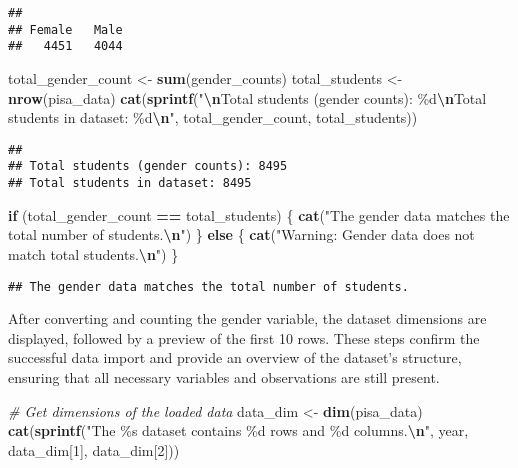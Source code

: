 \documentclass[
]{article}
\newenvironment{Shaded}{\begin{snugshade}}{\end{snugshade}}
\newcommand{\CommentTok}[1]{\textcolor[rgb]{0.56,0.35,0.01}{\textit{#1}}}
\newcommand{\ControlFlowTok}[1]{\textcolor[rgb]{0.13,0.29,0.53}{\textbf{#1}}}
\newcommand{\DecValTok}[1]{\textcolor[rgb]{0.00,0.00,0.81}{#1}}
\newcommand{\FunctionTok}[1]{\textcolor[rgb]{0.13,0.29,0.53}{\textbf{#1}}}
\newcommand{\NormalTok}[1]{#1}
\newcommand{\OtherTok}[1]{\textcolor[rgb]{0.56,0.35,0.01}{#1}}
\newcommand{\SpecialCharTok}[1]{\textcolor[rgb]{0.81,0.36,0.00}{\textbf{#1}}}
\newcommand{\StringTok}[1]{\textcolor[rgb]{0.31,0.60,0.02}{#1}}
\begin{document}
\begin{verbatim}
## 
## Female   Male 
##   4451   4044
\end{verbatim}

\begin{Shaded}
\begin{Highlighting}[]
\NormalTok{total\_gender\_count }\OtherTok{\textless{}{-}} \FunctionTok{sum}\NormalTok{(gender\_counts)}
\NormalTok{total\_students }\OtherTok{\textless{}{-}} \FunctionTok{nrow}\NormalTok{(pisa\_data)}
\FunctionTok{cat}\NormalTok{(}\FunctionTok{sprintf}\NormalTok{(}\StringTok{"}\SpecialCharTok{\textbackslash{}n}\StringTok{Total students (gender counts): \%d}\SpecialCharTok{\textbackslash{}n}\StringTok{Total students in dataset: \%d}\SpecialCharTok{\textbackslash{}n}\StringTok{"}\NormalTok{, total\_gender\_count, total\_students))}
\end{Highlighting}
\end{Shaded}

\begin{verbatim}
## 
## Total students (gender counts): 8495
## Total students in dataset: 8495
\end{verbatim}

\begin{Shaded}
\begin{Highlighting}[]
\ControlFlowTok{if}\NormalTok{ (total\_gender\_count }\SpecialCharTok{==}\NormalTok{ total\_students) \{}
    \FunctionTok{cat}\NormalTok{(}\StringTok{"The gender data matches the total number of students.}\SpecialCharTok{\textbackslash{}n}\StringTok{"}\NormalTok{)}
\NormalTok{\} }\ControlFlowTok{else}\NormalTok{ \{}
    \FunctionTok{cat}\NormalTok{(}\StringTok{"Warning: Gender data does not match total students.}\SpecialCharTok{\textbackslash{}n}\StringTok{"}\NormalTok{)}
\NormalTok{\}}
\end{Highlighting}
\end{Shaded}

\begin{verbatim}
## The gender data matches the total number of students.
\end{verbatim}

After converting and counting the gender variable, the dataset
dimensions are displayed, followed by a preview of the first 10 rows.
These steps confirm the successful data import and provide an overview
of the dataset's structure, ensuring that all necessary variables and
observations are still present.

\begin{Shaded}
\begin{Highlighting}[]
\CommentTok{\# Get dimensions of the loaded data}
\NormalTok{data\_dim }\OtherTok{\textless{}{-}} \FunctionTok{dim}\NormalTok{(pisa\_data)}
\FunctionTok{cat}\NormalTok{(}\FunctionTok{sprintf}\NormalTok{(}\StringTok{"The \%s dataset contains \%d rows and \%d columns.}\SpecialCharTok{\textbackslash{}n}\StringTok{"}\NormalTok{, year, data\_dim[}\DecValTok{1}\NormalTok{], data\_dim[}\DecValTok{2}\NormalTok{]))}
\end{Highlighting}
\end{Shaded}
\end{document}
